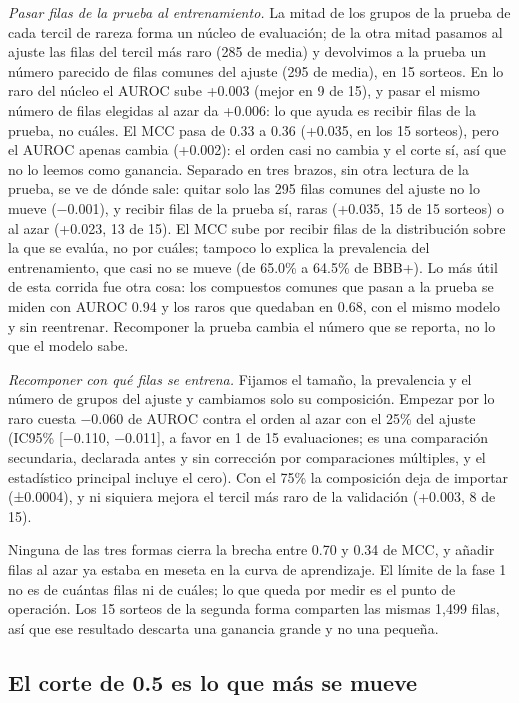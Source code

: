 \documentclass[letterpaper,11pt]{article}
\begin{document}
\emph{Pasar filas de la prueba al entrenamiento.} La mitad de los grupos de la prueba de cada tercil de rareza forma un núcleo de evaluación; de la otra mitad pasamos al ajuste las filas del tercil más raro (285 de media) y devolvimos a la prueba un número parecido de filas comunes del ajuste (295 de media), en 15 sorteos. En lo raro del núcleo el AUROC sube +0.003 (mejor en 9 de 15), y pasar el mismo número de filas elegidas al azar da +0.006: lo que ayuda es recibir filas de la prueba, no cuáles. El MCC pasa de 0.33 a 0.36 (+0.035, en los 15 sorteos), pero el AUROC apenas cambia (+0.002): el orden casi no cambia y el corte sí, así que no lo leemos como ganancia. Separado en tres brazos, sin otra lectura de la prueba, se ve de dónde sale: quitar solo las 295 filas comunes del ajuste no lo mueve (−0.001), y recibir filas de la prueba sí, raras (+0.035, 15 de 15 sorteos) o al azar (+0.023, 13 de 15). El MCC sube por recibir filas de la distribución sobre la que se evalúa, no por cuáles; tampoco lo explica la prevalencia del entrenamiento, que casi no se mueve (de 65.0\% a 64.5\% de BBB+). Lo más útil de esta corrida fue otra cosa: los compuestos comunes que pasan a la prueba se miden con AUROC 0.94 y los raros que quedaban en 0.68, con el mismo modelo y sin reentrenar. Recomponer la prueba cambia el número que se reporta, no lo que el modelo sabe.

\emph{Recomponer con qué filas se entrena.} Fijamos el tamaño, la prevalencia y el número de grupos del ajuste y cambiamos solo su composición. Empezar por lo raro cuesta −0.060 de AUROC contra el orden al azar con el 25\% del ajuste (IC95\% {[}−0.110, −0.011{]}, a favor en 1 de 15 evaluaciones; es una comparación secundaria, declarada antes y sin corrección por comparaciones múltiples, y el estadístico principal incluye el cero). Con el 75\% la composición deja de importar (±0.0004), y ni siquiera mejora el tercil más raro de la validación (+0.003, 8 de 15).

Ninguna de las tres formas cierra la brecha entre 0.70 y 0.34 de MCC, y añadir filas al azar ya estaba en meseta en la curva de aprendizaje. El límite de la fase 1 no es de cuántas filas ni de cuáles; lo que queda por medir es el punto de operación. Los 15 sorteos de la segunda forma comparten las mismas 1,499 filas, así que ese resultado descarta una ganancia grande y no una pequeña.

\subsection{El corte de 0.5 es lo que más se mueve}
\end{document}
